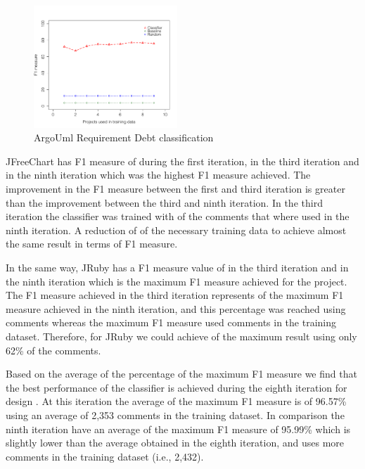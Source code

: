 \begin{figure}[thb!]
  \centering
  \includegraphics[width=0.48\textwidth]{figures/implementation_argo.pdf}
  \vspace{-3mm}
  \caption{ArgoUml Requirement Debt classification}
  \label{fig:implementation_argo_result}
\end{figure}

JFreeChart has F1 measure of \todo{} during the first iteration, \todo{} in the third iteration and \todo{} in the ninth iteration which was the highest F1 measure achieved. The improvement in the F1 measure between the first and third iteration is greater than the improvement between the third and ninth iteration. In the third iteration the classifier was trained with \todo{} of the comments that where used in the ninth iteration. A reduction of \todo{} of the necessary training data to achieve almost the same result in terms of F1 measure. 

In the same way, JRuby has a F1 measure value of \todo{} in the third iteration and \todo{} in the ninth iteration which is the maximum F1 measure achieved for the project. The F1 measure achieved in the third iteration represents \todo{} of the maximum F1 measure achieved in the ninth iteration, and this percentage was reached using \todo{} comments whereas the maximum F1 measure used \todo{} comments in the training dataset. Therefore, for JRuby we could achieve \todo{} of the maximum result using only 62\% of the comments.

Based on the average of the percentage of the maximum F1 measure we find that the best performance of the classifier is achieved during the eighth iteration for design \SATD. At this iteration the average of the maximum F1 measure is of 96.57\% using an average of 2,353 comments in the training dataset. In comparison the ninth iteration have an average of the maximum F1 measure of 95.99\% which is slightly lower than the average obtained in the eighth iteration, and uses more comments in the training dataset (i.e., 2,432). 

